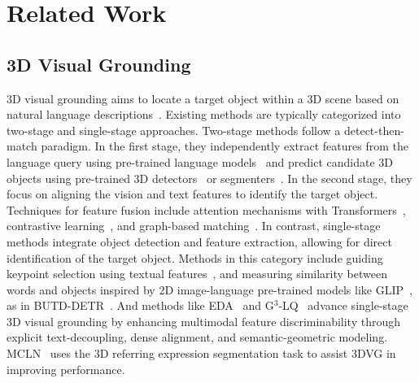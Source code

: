 \section{Related Work}
\label{sec:related}

\subsection{3D Visual Grounding}
3D visual grounding aims to locate a target object within a 3D scene based on natural language descriptions~\citep{liu2024surveytextguided3dvisual}. Existing methods are typically categorized into two-stage and single-stage approaches.
Two-stage methods follow a detect-then-match paradigm. In the first stage, they independently extract features from the language query using pre-trained language models~\citep{devlin2018bert,pennington2014glove,chung2014empirical} and predict candidate 3D objects using pre-trained 3D detectors~\citep{qi2019deep,liu2021group} or segmenters~\citep{chen2021hierarchical,jiang2020pointgroup,vu2022softgroup}. In the second stage, they focus on aligning the vision and text features to identify the target object. Techniques for feature fusion include attention mechanisms with Transformers~\citep{he2021transrefer3d,zhao20213dvg}, contrastive learning~\citep{abdelreheem20223dreftransformer}, and graph-based matching~\citep{feng2021free,huang2021text,yuan2021instancerefer}. 
In contrast, single-stage methods integrate object detection and feature extraction, allowing for direct identification of the target object. Methods in this category include guiding keypoint selection using textual features~\citep{luo20223d}, and measuring similarity between words and objects inspired by 2D image-language pre-trained models like GLIP~\citep{li2022grounded}, as in BUTD-DETR~\citep{jain2022bottom}. And methods like EDA~\citep{wu2023eda} and G$^3$-LQ~\citep{wang2024g} advance single-stage 3D visual grounding by enhancing multimodal feature discriminability through explicit text-decoupling, dense alignment, and semantic-geometric modeling. MCLN~\citep{qian2025multi} uses the 3D referring expression segmentation task to assist 3DVG in improving performance.


